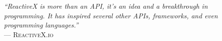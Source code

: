 \begin{flushright}
\mbox{}\vfill
{\sffamily\itshape
``ReactiveX is more than an API, it's an idea and a breakthrough in programming. It has inspired several other APIs, frameworks, and even programming languages.''\\}
--- \textsc{ReactiveX.io}
\end{flushright}
